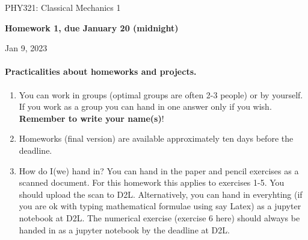 \documentclass[%
oneside,                 %
final,                   %
10pt]{article}
\begin{document}

\newcommand{\exercisesection}[1]{\subsection*{#1}}






\thispagestyle{empty}

\begin{center}
{\LARGE\bf
\begin{spacing}{1.25}
PHY321: Classical Mechanics 1
\end{spacing}
}
\end{center}


\begin{center}
{\bf Homework 1, due January 20 (midnight)${}^{}$} \\ [0mm]
\end{center}

\begin{center}
\end{center}
    

\begin{center}
Jan 9, 2023
\end{center}

\vspace{1cm}


\paragraph{Practicalities about  homeworks and projects.}
\begin{enumerate}
\item You can work in groups (optimal groups are often 2-3 people) or by yourself. If you work as a group you can hand in one answer only if you wish. \textbf{Remember to write your name(s)}!

\item Homeworks (final version) are available approximately ten days before the  deadline. 

\item How do I(we)  hand in?  You can hand in the paper and pencil exercises as a scanned document. For this homework this applies to exercises 1-5. You should upload the scan to D2L. Alternatively, you can hand in everyhting (if you are ok with typing mathematical formulae using say Latex) as a jupyter notebook at D2L. The numerical exercise (exercise 6 here) should always be handed in as a jupyter notebook by the deadline at D2L. 
\end{enumerate}
\end{document}
